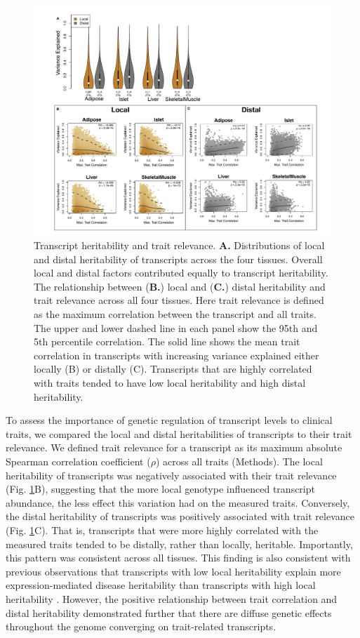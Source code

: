 \documentclass[
]{article}
\begin{document}
\begin{figure}[ht!]
\includegraphics[width=\textwidth]{Figures/Fig2_motivation.pdf} 
\caption{Transcript heritability and trait relevance. 
\textbf{A.} Distributions of local and distal heritability 
of transcripts across the four tissues. Overall local and 
distal factors contributed equally to transcript heritability. 
The relationship between (\textbf{B.}) local and (\textbf{C.}) 
distal heritability and trait relevance across all four 
tissues. Here trait relevance is defined as the maximum 
correlation between the transcript and all traits. The upper 
and lower dashed line in each panel show the 95th and 5th 
percentile correlation. The solid line shows the mean trait 
correlation in transcripts with increasing variance explained 
either locally (B) or distally (C). Transcripts that are highly 
correlated with traits tended to have low local heritability and 
high distal heritability.}
\label{fig:motivation}
\end{figure}

To assess the importance of genetic regulation of transcript levels to
clinical traits, we compared the local and distal heritabilities of
transcripts to their trait relevance. We defined trait relevance for a
transcript as its maximum absolute Spearman correlation coefficient
(\(\rho\)) across all traits (Methods). The local heritability of
transcripts was negatively associated with their trait relevance (Fig.
\ref{fig:motivation}B), suggesting that the more local genotype
influenced transcript abundance, the less effect this variation had on
the measured traits. Conversely, the distal heritability of transcripts
was positively associated with trait relevance (Fig.
\ref{fig:motivation}C). That is, transcripts that were more highly
correlated with the measured traits tended to be distally, rather than
locally, heritable. Importantly, this pattern was consistent across all
tissues. This finding is also consistent with previous observations that
transcripts with low local heritability explain more expression-mediated
disease heritability than transcripts with high local heritability
\cite{pmid32424349}. However, the positive relationship between trait
correlation and distal heritability demonstrated further that there are
diffuse genetic effects throughout the genome converging on
trait-related transcripts.
\end{document}
